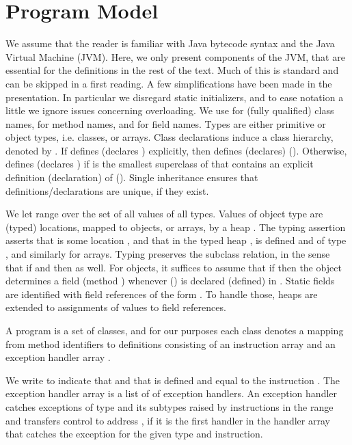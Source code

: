 \documentclass[10pt,twocolumn]{article}
\begin{document}
\section{Program Model}\label{sect:prog_model}
We assume that the reader is familiar with Java bytecode syntax and the Java Virtual Machine (JVM). Here, we only present components of the JVM, that are essential for the definitions in the rest of the text. Much of this is standard and can be skipped in a first reading. A few simplifications have been made in the presentation. In particular we disregard static initializers, and to ease notation a little we ignore issues concerning overloading. We use  for (fully qualified) class names,  for method names, and  for field names. Types are either primitive or object types, i.e. classes, or arrays. Class declarations induce a class hierarchy, denoted by . If  defines  (declares ) explicitly, then  defines (declares)  (). Otherwise,  defines  (declares ) if  is the smallest superclass of  that contains an explicit definition (declaration) of   (). Single inheritance ensures that definitions/declarations are unique, if they exist.

We let  range over the set of all values of all types. Values of object type are (typed) locations, mapped to objects, or arrays, by a heap . The typing assertion  asserts that  is some location , and that in the typed heap ,  is defined and of type , and similarly for arrays. Typing preserves the subclass relation, in the sense that if  and  then  as well. For objects, it suffices to assume that if  then the object  determines a field  (method ) whenever  () is declared (defined) in . Static fields are identified with field references of the form . To handle those, heaps are extended to assignments of values to field references.

A program is a set of classes, and for our purposes each class denotes a mapping from method identifiers to definitions  consisting of an instruction array  and an exception handler array .

We write  to indicate that  and that  is defined and equal to the instruction . The exception handler array  is a list of of exception handlers. An exception handler  catches exceptions of type  and its subtypes raised by instructions in the range  and transfers control to address , if it is the first handler in the handler array that catches the exception for the given type and instruction.
\end{document}
